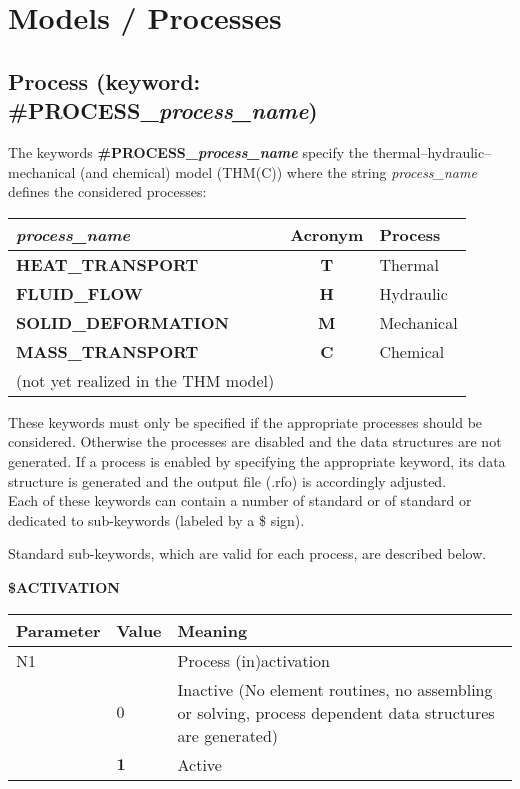\section{Models / Processes}

\subsection{Process (keyword: \#PROCESS\_{\it process\_name})}

The keywords {\bf \#PROCESS\_{\it process\_name}} specify the
thermal--hydraulic--mechanical (and chemical) model (THM(C)) where the string {\it
process\_name} defines the considered processes:

\begin{center}
\begin{tabular}{|l|c|l|} \hline
{\it process\_name} & Acronym & Process \\ \hline \hline
%
{\bf HEAT\_TRANSPORT} &  {\bf T}   & Thermal \\
{\bf FLUID\_FLOW} & {\bf H} & Hydraulic\\
{\bf SOLID\_DEFORMATION}   & {\bf M} & Mechanical \\
{\bf MASS\_TRANSPORT}   & {\bf C} & Chemical \\
(not yet realized in the THM model) & & \\ \hline
\end{tabular}
\end{center}


These keywords must only be specified if the appropriate processes should be considered.
Otherwise the processes are disabled and the data structures are not generated. If a
process is enabled by specifying the appropriate keyword, its data structure is
generated and the output file (\*.rfo) is accordingly adjusted. \\

Each of these keywords can contain a number of standard or of standard or dedicated to
sub-keywords (labeled by a \$ sign).

Standard sub-keywords, which are valid for each process, are described below.

\vspace{0.5cm}

\hspace{1cm} {\bf \$ACTIVATION}

\begin{center}
\begin{tabular*}{13cm}{|p{}|p{}|p{8.75cm}|} \hline
Parameter& Value & Meaning \\ \hline \hline
%
N1 &     & Process (in)activation \\
   &$0$ & Inactive (No element routines, no assembling or solving,
   process dependent data structures are generated) \\
   &$ \mathbf 1$ & Active \\ \hline
\end{tabular*}
\end{center}

